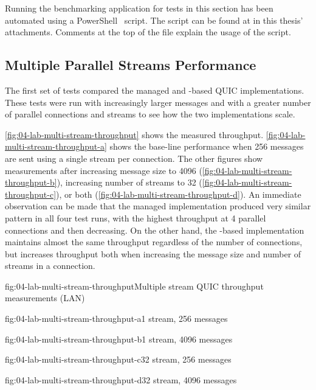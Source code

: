 Running the benchmarking application for tests in this section has been automated using a
PowerShell~\cite{powershell} script. The script can be found at
 in this thesis' attachments. Comments
at the top of the file explain the usage of the script.

\subsection{Multiple Parallel Streams Performance}\label{sec:04-multi-stream-perf}

The first set of tests compared the managed and \libmsquic{}-based QUIC implementations. These tests
were run with increasingly larger messages and with a greater number of parallel connections and
streams to see how the two implementations scale.

\autoref{fig:04-lab-multi-stream-throughput} shows the measured throughput.
\autoref{fig:04-lab-multi-stream-throughput-a} shows the base-line performance when \SI{256}{\byte}
messages are sent using a single stream per connection. The other figures show measurements after
increasing message size to \SI{4096}{\byte} (\autoref{fig:04-lab-multi-stream-throughput-b}),
increasing number of streams to 32 (\autoref{fig:04-lab-multi-stream-throughput-c}), or both
(\autoref{fig:04-lab-multi-stream-throughput-d}). An immediate observation can be made that the
managed implementation produced very similar pattern in all four test runs, with the highest
throughput at 4 parallel connections and then decreasing. On the other hand, the \libmsquic{}-based
implementation maintains almost the same throughput regardless of the number of connections, but
increases throughput both when increasing the message size and number of streams in a connection.

\begin{myFigure}{fig:04-lab-multi-stream-throughput}{Multiple stream QUIC throughput measurements (LAN)}
\begin{mySubfigure}{0.49\linewidth}{fig:04-lab-multi-stream-throughput-a}{1 stream, \SI{256}{\byte} messages}
\footnotesize

\end{mySubfigure}
\begin{mySubfigure}{0.49\linewidth}{fig:04-lab-multi-stream-throughput-b}{1 stream, \SI{4096}{\byte} messages}
\footnotesize

\end{mySubfigure}

\begin{mySubfigure}{0.49\linewidth}{fig:04-lab-multi-stream-throughput-c}{32 stream, \SI{256}{\byte} messages}
\footnotesize

\end{mySubfigure}
\begin{mySubfigure}{0.49\linewidth}{fig:04-lab-multi-stream-throughput-d}{32 stream, \SI{4096}{\byte} messages}
\footnotesize

\end{mySubfigure}
\end{myFigure}

